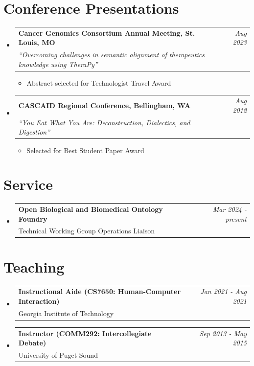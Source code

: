 \documentclass[letterpaper,11pt]{article}
\makeatletter
\newcommand{\resumeItem}[1]{
  \item{
    {#1 \vspace{-2pt}}
  }
}
\newcommand{\resumeSubheading}[4]{
    \vspace{-1pt}\item[]
    \begin{tabular*}{0.97\textwidth}{l@{\extracolsep{\fill}}r}
      \textbf{#1} & \textit{#2} \\
      #3 & #4 \\
    \end{tabular*}\vspace{-5pt}
}
\newcommand{\resumeSubHeadingListStart}{\begin{itemize}[leftmargin=*]}
\newcommand{\resumeSubHeadingListEnd}{\end{itemize}}
\newcommand{\resumeItemListStart}{\begin{itemize}}
\newcommand{\resumeItemListEnd}{\end{itemize}\vspace{-5pt}}
\makeatother
\begin{document}
\section{Conference Presentations}
  \resumeSubHeadingListStart
    \resumeSubheading
      {Cancer Genomics Consortium Annual Meeting, St. Louis, MO}{Aug 2023}
      {\textit{``Overcoming challenges in semantic alignment of therapeutics knowledge using TheraPy''}}{}
      \resumeItemListStart
        \resumeItem{Abstract selected for Technologist Travel Award}
      \resumeItemListEnd
    \resumeSubheading
      {CASCAID Regional Conference, Bellingham, WA}{Aug 2012}
      {\textit{``You Eat What You Are: Deconstruction, Dialectics, and Digestion''}}{}
      \resumeItemListStart
        \resumeItem{Selected for Best Student Paper Award}
      \resumeItemListEnd
  \resumeSubHeadingListEnd


\section{Service}
  \resumeSubHeadingListStart
    \resumeSubheading
      {Open Biological and Biomedical Ontology Foundry}{Mar 2024 - present}
      {Technical Working Group Operations Liaison}{}
  \resumeSubHeadingListEnd

\section{Teaching}
  \resumeSubHeadingListStart
    \resumeSubheading
      {Instructional Aide (CS7650: Human-Computer Interaction)}{Jan 2021 - Aug 2021}
      {Georgia Institute of Technology}{}
    \resumeSubheading
      {Instructor (COMM292: Intercollegiate Debate)}{Sep 2013 - May 2015}
      {University of Puget Sound}{}
  \resumeSubHeadingListEnd
\end{document}
